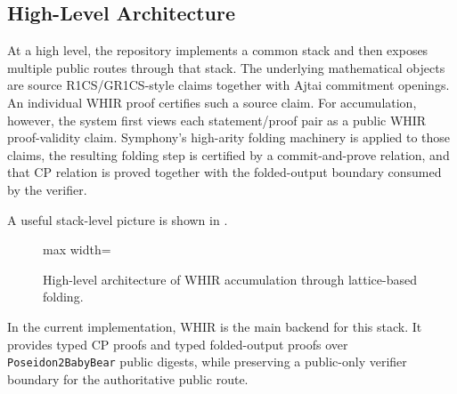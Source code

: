 \documentclass[11pt]{article}
\theoremstyle{definition}
\begin{document}
\subsection{High-Level Architecture}
\label{sec:high-level-architecture}
At a high level, the repository implements a common stack and then exposes
multiple public routes through that stack. The underlying mathematical objects
are source R1CS/GR1CS-style claims together with Ajtai commitment openings. An
individual WHIR proof certifies such a source claim. For accumulation, however,
the system first views each statement/proof pair as a public WHIR proof-validity
claim. Symphony's high-arity folding machinery is applied to those claims, the
resulting folding step is certified by a commit-and-prove relation, and that CP
relation is proved together with the folded-output boundary consumed by the
verifier.

A useful stack-level picture is shown in .

\begin{figure}[H]
\centering
\begin{adjustbox}{max width=\linewidth}
\end{adjustbox}
\caption{High-level architecture of WHIR accumulation through lattice-based folding.}
\label{fig:high-level-architecture}
\end{figure}

In the current implementation, WHIR is the main backend for this stack. It
provides typed CP proofs and typed folded-output proofs over
\texttt{Poseidon2BabyBear} public digests, while preserving a public-only
verifier boundary for the authoritative public route.
\end{document}
